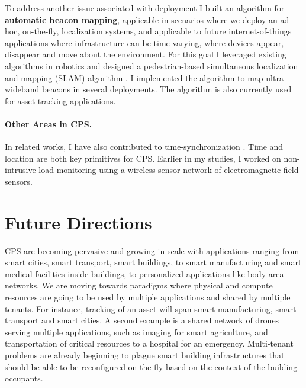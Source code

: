 \documentclass[10pt]{article}
\begin{document}
To address another issue associated with deployment I built an algorithm for {\bf automatic beacon mapping}, applicable in scenarios where we deploy an ad-hoc, on-the-fly, localization systems, and  applicable to future internet-of-things applications where  infrastructure can be time-varying, where devices appear, disappear and move about the environment. %
For this goal I leveraged existing algorithms in robotics and designed a pedestrian-based simultaneous localization and mapping (SLAM) algorithm \cite{mobileAR}. I implemented the algorithm to map ultra-wideband beacons in several deployments. The algorithm is also currently used for asset tracking applications.


\paragraph{Other Areas in CPS. }
In related works, I have also contributed to time-synchronization \cite{buevich2013hardware, dongare2017pulsar}. Time and location are both key primitives for CPS. 
Earlier in my studies, I worked on non-intrusive load monitoring \cite{rajagopal2013magnetic, rajagopal2013demo} using a wireless sensor network of electromagnetic field sensors. 

\section{Future Directions}

CPS are becoming pervasive and growing in scale with applications ranging from smart cities, smart transport, smart buildings, to smart manufacturing and smart medical facilities inside buildings, to personalized applications like body area networks.  %
We are moving towards paradigms where physical and compute resources are going to be used by multiple applications and shared by multiple tenants.  For instance, tracking of an asset will span smart manufacturing, smart transport and smart cities.  A second example is a shared network of drones serving multiple applications, such as imaging for smart agriculture, and transportation of critical resources to a hospital for an emergency. Multi-tenant problems are already beginning to plague smart building infrastructures that should be able to be reconfigured on-the-fly based on the context of the building occupants. %
\end{document}
